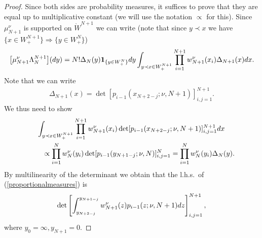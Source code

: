 \documentclass[11pt]{article}
\numberwithin{equation}{section}
\begin{document}
\begin{proof}Since both sides are probability measures, it suffices to prove that they are equal up to multiplicative constant (we will use the notation $\propto$ for this). Since $\mu_{N+1}^{\nu}$ is supported on $\mathring{W}^{N+1}$ we can write (note that since $y\prec x$ we have $\big\{x \in W^{N+1}_+\big\} \Rightarrow \big\{y \in W^{N}_+\big\}$)
\begin{gather*}
\big[\mu_{N+1}^{\nu}\Lambda_N^{N+1}\big]({\rm d}y)=N! \Delta_N(y)\mathbf{1}_{\{y \in W_+^N \}}{\rm d}y \int_{y\prec x \in W^{N+1}_+}^{}\prod_{i=1}^{N+1}w_{N+1}^{\nu}(x_i) \Delta_{N+1}(x){\rm d}x.
\end{gather*}
Note that we can write
\begin{gather*}
\Delta_{N+1}(x)=\det [p_{i-1} (x_{N+2-j};\nu,N+1 ) ]^{N+1}_{i,j=1}.
\end{gather*}
We thus need to show
\begin{gather}
\int_{y\prec x \in W^{N+1}_+}^{}\prod_{i=1}^{N+1}w_{N+1}^{\nu}(x_i) \det [p_{i-1} (x_{N+2-j};\nu,N+1 ) ]^{N+1}_{i,j=1}{\rm d}x\nonumber\\
\qquad {}\propto \prod_{i=1}^{N}w_N^{\nu}(y_i)\det [p_{i-1} (y_{N+1-j};\nu,N ) ]^{N}_{i,j=1}
 =\prod_{i=1}^{N}w_N^{\nu}(y_i)\Delta_N(y) .\label{proportionalmeasures}
\end{gather}
By multilinearity of the determinant we obtain that the l.h.s.\ of (\ref{proportionalmeasures}) is
\begin{gather*}
\det\left[\int_{y_{N+2-j}}^{y_{N+1-j}}w_{N+1}^{\nu}(z)p_{i-1} (z;\nu,N+1 ){\rm d}z\right]^{N+1}_{i,j=1},
\end{gather*}
where $y_0=\infty, y_{N+1}=0$.


\end{proof}
\end{document}
